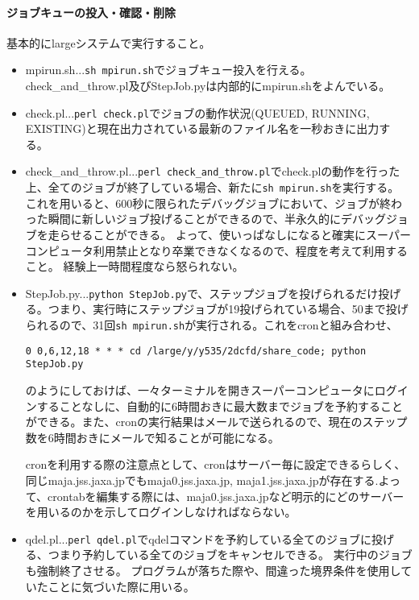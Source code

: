 \documentclass{jsarticle}
\begin{document}
\paragraph{ジョブキューの投入・確認・削除}
基本的にlargeシステムで実行すること。
\begin{itemize}
\item mpirun.sh...\verb|sh mpirun.sh|でジョブキュー投入を行える。check\_and\_throw.pl及びStepJob.pyは内部的にmpirun.shをよんでいる。
\item check.pl...\verb|perl check.pl|でジョブの動作状況(QUEUED, RUNNING, EXISTING)と現在出力されている最新のファイル名を一秒おきに出力する。
\item check\_and\_throw.pl...\verb|perl check_and_throw.pl|でcheck.plの動作を行った上、全てのジョブが終了している場合、新たに\verb|sh mpirun.sh|を実行する。
これを用いると、600秒に限られたデバッグジョブにおいて、ジョブが終わった瞬間に新しいジョブ投げることができるので、半永久的にデバッグジョブを走らせることができる。
よって、使いっぱなしになると確実にスーパーコンピュータ利用禁止となり卒業できなくなるので、程度を考えて利用すること。
経験上一時間程度なら怒られない。
\item StepJob.py...\verb|python StepJob.py|で、ステップジョブを投げられるだけ投げる。つまり、実行時にステップジョブが19投げられている場合、50まで投げられるので、31回\verb|sh mpirun.sh|が実行される。これをcronと組み合わせ、
\begin{verbatim}
0 0,6,12,18 * * * cd /large/y/y535/2dcfd/share_code; python StepJob.py
\end{verbatim}
のようにしておけば、一々ターミナルを開きスーパーコンピュータにログインすることなしに、自動的に6時間おきに最大数までジョブを予約することができる。また、cronの実行結果はメールで送られるので、現在のステップ数を6時間おきにメールで知ることが可能になる。

cronを利用する際の注意点として、cronはサーバー毎に設定できるらしく、同じmaja.jss.jaxa.jpでもmaja0.jss.jaxa.jp, maja1.jss.jaxa.jpが存在する.よって、crontabを編集する際には、maja0.jss.jaxa.jpなど明示的にどのサーバーを用いるのかを示してログインしなければならない。
\item qdel.pl...\verb|perl qdel.pl|でqdelコマンドを予約している全てのジョブに投げる、つまり予約している全てのジョブをキャンセルできる。
実行中のジョブも強制終了させる。
プログラムが落ちた際や、間違った境界条件を使用していたことに気づいた際に用いる。
\end{itemize}
\end{document}
